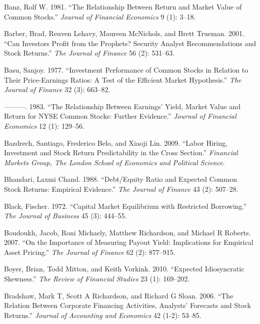 \documentclass[
  letterpaper,
  DIV=11,
  numbers=noendperiod]{scrreprt}
\newlength{\cslhangindent}
\newlength{\cslentryspacingunit} %
\newenvironment{CSLReferences}[2] %
 {%
  \setlength{\parindent}{0pt}
  \ifodd #1
  \let\oldpar\par
  \def\par{\hangindent=\cslhangindent\oldpar}
  \fi
  \setlength{\parskip}{#2\cslentryspacingunit}
 }%
 {}
\begin{document}
\begin{CSLReferences}{1}{0}
\leavevmode{}%
Banz, Rolf W. 1981. {``The Relationship Between Return and Market Value
of Common Stocks.''} \emph{Journal of Financial Economics} 9 (1): 3--18.

\leavevmode{}%
Barber, Brad, Reuven Lehavy, Maureen McNichols, and Brett Trueman. 2001.
{``Can Investors Profit from the Prophets? Security Analyst
Recommendations and Stock Returns.''} \emph{The Journal of Finance} 56
(2): 531--63.

\leavevmode{}%
Basu, Sanjoy. 1977. {``Investment Performance of Common Stocks in
Relation to Their Price-Earnings Ratios: A Test of the Efficient Market
Hypothesis.''} \emph{The Journal of Finance} 32 (3): 663--82.

\leavevmode{}%
---------. 1983. {``The Relationship Between Earnings' Yield, Market
Value and Return for NYSE Common Stocks: Further Evidence.''}
\emph{Journal of Financial Economics} 12 (1): 129--56.

\leavevmode{}%
Bazdrech, Santiago, Frederico Belo, and Xiaoji Lin. 2009. {``Labor
Hiring, Investment and Stock Return Predictability in the Cross
Section.''} \emph{Financial Markets Group, The London School of
Economics and Political Science}.

\leavevmode{}%
Bhandari, Laxmi Chand. 1988. {``Debt/Equity Ratio and Expected Common
Stock Returns: Empirical Evidence.''} \emph{The Journal of Finance} 43
(2): 507--28.

\leavevmode{}%
Black, Fischer. 1972. {``Capital Market Equilibrium with Restricted
Borrowing.''} \emph{The Journal of Business} 45 (3): 444--55.

\leavevmode{}%
Boudoukh, Jacob, Roni Michaely, Matthew Richardson, and Michael R
Roberts. 2007. {``On the Importance of Measuring Payout Yield:
Implications for Empirical Asset Pricing.''} \emph{The Journal of
Finance} 62 (2): 877--915.

\leavevmode{}%
Boyer, Brian, Todd Mitton, and Keith Vorkink. 2010. {``Expected
Idiosyncratic Skewness.''} \emph{The Review of Financial Studies} 23
(1): 169--202.

\leavevmode{}%
Bradshaw, Mark T, Scott A Richardson, and Richard G Sloan. 2006. {``The
Relation Between Corporate Financing Activities, Analysts' Forecasts and
Stock Returns.''} \emph{Journal of Accounting and Economics} 42 (1-2):
53--85.


\end{CSLReferences}
\end{document}
